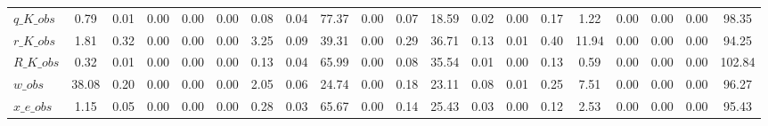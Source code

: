 \begin{center}
\begin{longtable}{lccccccccccccccccccc}
$q\_K\_obs                  $	 & 	                0.79	 & 	                0.01	 & 	                0.00	 & 	                0.00	 & 	                0.00	 & 	                0.08	 & 	                0.04	 & 	               77.37	 & 	                0.00	 & 	                0.07	 & 	               18.59	 & 	                0.02	 & 	                0.00	 & 	                0.17	 & 	                1.22	 & 	                0.00	 & 	                0.00	 & 	                0.00	 & 	               98.35 \\ 
$r\_K\_obs                  $	 & 	                1.81	 & 	                0.32	 & 	                0.00	 & 	                0.00	 & 	                0.00	 & 	                3.25	 & 	                0.09	 & 	               39.31	 & 	                0.00	 & 	                0.29	 & 	               36.71	 & 	                0.13	 & 	                0.01	 & 	                0.40	 & 	               11.94	 & 	                0.00	 & 	                0.00	 & 	                0.00	 & 	               94.25 \\ 
$R\_K\_obs                  $	 & 	                0.32	 & 	                0.01	 & 	                0.00	 & 	                0.00	 & 	                0.00	 & 	                0.13	 & 	                0.04	 & 	               65.99	 & 	                0.00	 & 	                0.08	 & 	               35.54	 & 	                0.01	 & 	                0.00	 & 	                0.13	 & 	                0.59	 & 	                0.00	 & 	                0.00	 & 	                0.00	 & 	              102.84 \\ 
$w\_obs                     $	 & 	               38.08	 & 	                0.20	 & 	                0.00	 & 	                0.00	 & 	                0.00	 & 	                2.05	 & 	                0.06	 & 	               24.74	 & 	                0.00	 & 	                0.18	 & 	               23.11	 & 	                0.08	 & 	                0.01	 & 	                0.25	 & 	                7.51	 & 	                0.00	 & 	                0.00	 & 	                0.00	 & 	               96.27 \\ 
$x\_e\_obs                  $	 & 	                1.15	 & 	                0.05	 & 	                0.00	 & 	                0.00	 & 	                0.00	 & 	                0.28	 & 	                0.03	 & 	               65.67	 & 	                0.00	 & 	                0.14	 & 	               25.43	 & 	                0.03	 & 	                0.00	 & 	                0.12	 & 	                2.53	 & 	                0.00	 & 	                0.00	 & 	                0.00	 & 	               95.43 \\ 

\end{longtable}
\end{center}
